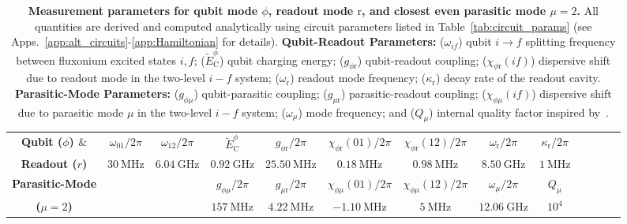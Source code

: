 \documentclass[%
reprint,
superscriptaddress,
 amsmath,amssymb,
 aps,
 prx,
longbibliography,
floatfix,
]{revtex4-2}
\begin{document}
\begin{table}[tb]
    \centering
\begin{tabular}{|c|c|c|c|c|c|c|c|c|c|c|c|c|}
    \hline
    \textbf{Qubit ($\phi$) $\&$}&$\omega_{01}/2\pi$&$\omega_{12}/2\pi$ &$\tilde{E}^\phi_\textrm{C}$ &$g_{\phi \textrm{r}}/2\pi$&$\chi_{\phi \textrm{r}}(01)/2\pi$&$\chi_{\phi \textrm{r}}(12)/2\pi$&$\omega_\textrm{r}/2\pi$&$\kappa_\textrm{r}/2\pi$\\
    \cline{2-9}
\textbf{Readout ($r$)}&$30 \ \mathrm{MHz}$& $6.04 \ \mathrm{GHz}$ & $0.92 \ \mathrm{GHz}$& $25.50 \ \mathrm{MHz}$& $0.18 \ \mathrm{MHz}$&$0.98 \ \mathrm{MHz}$&$8.50 \ \mathrm{GHz}$&$1 \ \mathrm{MHz}$\\    
\hline\textbf{Parasitic-Mode} & \multicolumn{2}{c|}{} & $g_{\phi\mu}/2\pi$&$g_{\mu \textrm{r}}/2\pi$&$\chi_{\phi\mu}(01)/2\pi$&$\chi_{\phi\mu}(12)/2\pi$&$\omega_\mu/2\pi$&$Q_\mu$\\
    \cline{4-9}
\textbf{($\mu=2$)}&\multicolumn{2}{c|}{} &$157 \ \mathrm{MHz}$& $4.22 \ \mathrm{MHz}$& $-1.10 \ \mathrm{MHz}$& $5 \ \mathrm{MHz}$& $12.06 \ \mathrm{GHz}$&$10^{4}$\\    
\hline
\end{tabular}
\caption{{\bf Measurement parameters for qubit mode $\phi$, readout mode $\mathrm{r}$, and closest even parasitic mode $\mu=2$.} All quantities are derived and computed analytically using circuit parameters listed in Table~\ref{tab:circuit_params} (see Apps.~\ref{app:alt_circuits}-\ref{app:Hamiltonian} for details). \textbf{Qubit-Readout Parameters:} ($\omega_{if}$) qubit $i\rightarrow f$ splitting frequency between fluxonium excited states $i, f$; ($\tilde{E}^\phi_\textrm{C}$) qubit charging energy; ($g_{\phi \textrm{r}}$) qubit-readout coupling; ($\chi_{\phi \textrm{r}}(if)$) dispersive shift due to readout mode in the two-level $i-f$ system; ($\omega_\textrm{r}$) readout mode frequency; ($\kappa_\textrm{r}$) decay rate of the readout cavity. \textbf{Parasitic-Mode Parameters:} ($g_{\phi \mu}$) qubit-parasitic coupling; ($g_{\mu \textrm{r}}$) parasitic-readout coupling; ($\chi_{\phi \mu}(if)$) dispersive shift due to parasitic mode $\mu$ in the two-level $i-f$ system; ($\omega_\mu$) mode frequency; and ($Q_\mu$) internal quality factor inspired by~\cite{masluk_microwave_2012}.}   \label{tab:readout_params}
\end{table}



\end{document}

